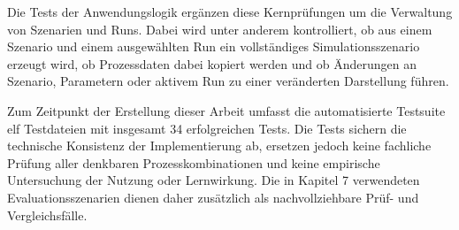 Die Tests der Anwendungslogik ergänzen diese Kernprüfungen um die Verwaltung von Szenarien und Runs. Dabei wird unter anderem kontrolliert, ob aus einem Szenario und einem ausgewählten Run ein vollständiges Simulationsszenario erzeugt wird, ob Prozessdaten dabei kopiert werden und ob Änderungen an Szenario, Parametern oder aktivem Run zu einer veränderten Darstellung führen.

Zum Zeitpunkt der Erstellung dieser Arbeit umfasst die automatisierte Testsuite elf Testdateien mit insgesamt 34 erfolgreichen Tests. Die Tests sichern die technische Konsistenz der Implementierung ab, ersetzen jedoch keine fachliche Prüfung aller denkbaren Prozesskombinationen und keine empirische Untersuchung der Nutzung oder Lernwirkung. Die in Kapitel 7 verwendeten Evaluationsszenarien dienen daher zusätzlich als nachvollziehbare Prüf- und Vergleichsfälle.
